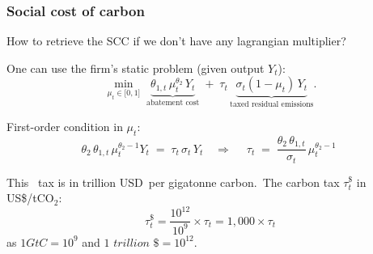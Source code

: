 \documentclass[xcolor=x11names,compress,aspectratio=169]{beamer}%
\makeatletter
\newenvironment{stepitemizewithalert}{\begin{itemize}[<+-| alert@+>]}{\end{itemize} }
\renewenvironment{itemize}{\begin{compactitemize}[<+-| alert@+>]}{\end{compactitemize}}
\renewenvironment{stepitemizewithalert}{\begin{compactitemize}[<+-| alert@+>]}{\end{compactitemize}}
\renewenvironment{stepitemizewithalert}{\begin{itemize}}{\end{itemize}}
\makeatother
\begin{document}
\begin{frame}%
%

\frametitle{Social cost of carbon}%


\begin{stepitemizewithalert}
\item How to retrieve the SCC if we don't have any lagrangian multiplier?
\end{stepitemizewithalert}

\begin{itemize}
\item One can use the firm's static problem (given output $Y_{t}$):
\[
\min_{\mu_{t}\in\lbrack0,1]}\;\underbrace{\theta_{1,t}\,\mu_{t}^{\theta_{2}%
}\,Y_{t}}_{\text{abatement cost}}\;+\;\tau_{t}\,\underbrace{\sigma_{t}%
(1-\mu_{t})\,Y_{t}}_{\text{taxed residual emissions}}.
\]


\item First-order condition in $\mu_{t}$:
\[
\theta_{2}\,\theta_{1,t}\,\mu_{t}^{\theta_{2}-1}Y_{t}\;=\;\tau_{t}\,\sigma
_{t}\,Y_{t}\quad\Rightarrow\quad
\boxed{\;\tau_t \;=\; \frac{\theta_2\,\theta_{1,t}}{\sigma_t}\,\mu_t^{\theta_2-1}\;}
\]


\item This \ tax is in trillion USD\ per gigatonne carbon.\ The carbon tax
$\tau_{t}^{\$}$ in US\$/tCO$_{2}$:
\[
\tau_{t}^{\$}=\frac{10^{12}}{10^{9}}\times\tau_{t}=1,000\times\tau_{t}%
\]
as $1GtC=10^{9}$ and $1$ $trillion$ $\$=10^{12}$.
\end{itemize}%

\transboxout
\end{frame}%



%
\end{document}
